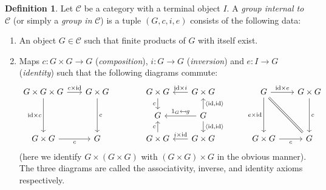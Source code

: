 \documentclass[10pt]{amsart}
\numberwithin{equation}{section}
\def\~#1{\mathscr{#1}}
\newcommand{\id}{\mathrm{id}}
\theoremstyle{plain}
\theoremstyle{definition}
\newtheorem{defn}[thm]{Definition}
\theoremstyle{remark}
\begin{document}
\begin{defn}
    Let $\~C$ be a category with a terminal object $I$. A \emph{group internal to $\~C$} (or simply a \emph{group in} $\~C$) is a tuple $(G, c, i, e)$ consists of the following data:
    \begin{enumerate}
        \item An object $G \in \~C$ such that finite products of $G$ with itself exist.
        \item Maps $c: G \times G \to G$ (\emph{composition}), $i: G \to G$ (\emph{inversion}) and $e: I \to G$ (\emph{identity}) such that the following diagrams commute:
\begin{equation}\label{eq:1.1}
\begin{tikzcd}[sep=scriptsize]
    {G \times G \times G} & {G \times G } && {G \times G} & {G \times G} && G & {G\times G} \\
    &&& G & G \\
    {G \times G} & G && {G \times G} & {G \times G} && {G \times G} & G
    \arrow["{{c \times \id}}", from=1-1, to=1-2]
    \arrow["{{\id \times c}}"', from=1-1, to=3-1]
    \arrow["c", from=1-2, to=3-2]
    \arrow["c"', from=1-4, to=2-4]
    \arrow["{{\id \times i}}"', from=1-5, to=1-4]
    \arrow["{{\id \times e}}", from=1-7, to=1-8]
    \arrow["{{e \times \id}}"', from=1-7, to=3-7]
    \arrow[equals, from=1-7, to=3-8]
    \arrow["c", from=1-8, to=3-8]
    \arrow["{{\langle \id, \id \rangle}}"', from=2-5, to=1-5]
    \arrow["{{1_G \mapsfrom g }}"', from=2-5, to=2-4]
    \arrow["{{\langle \id, \id \rangle}}", from=2-5, to=3-5]
    \arrow["c"', from=3-1, to=3-2]
    \arrow["c", from=3-4, to=2-4]
    \arrow["{{i \times \id}}"', from=3-5, to=3-4]
    \arrow["c"', from=3-7, to=3-8]
\end{tikzcd}\end{equation}
(here we identify $G\times(G \times G)$ with $(G \times G) \times G$ in the obvious manner). The three diagrams are called the associativity, inverse, and identity axioms respectively.
    \end{enumerate}
\end{defn}
\end{document}
